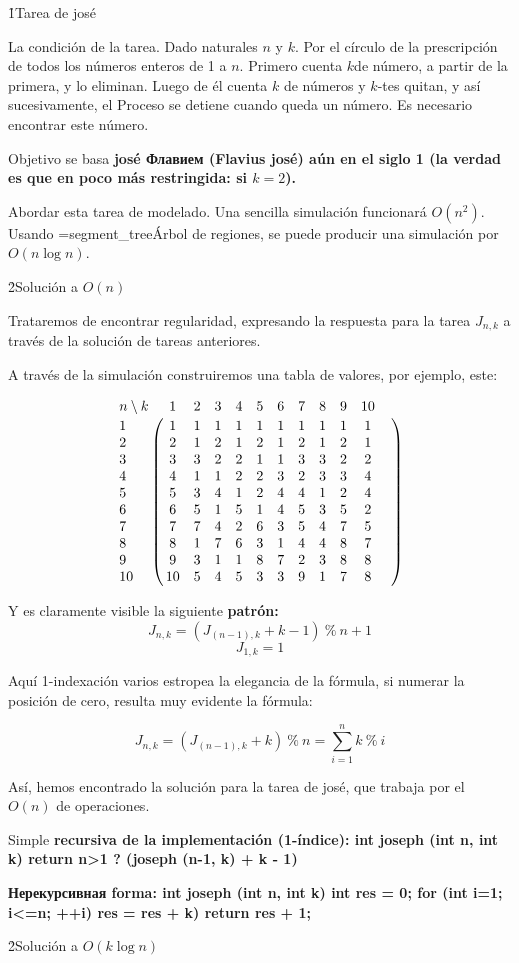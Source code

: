 \h1{Tarea de josé}

La condición de la tarea. Dado naturales $n$ y $k$. Por el círculo de la prescripción de todos los números enteros de 1 a $n$. Primero cuenta $k$de número, a partir de la primera, y lo eliminan. Luego de él cuenta $k$ de números y $k$-tes quitan, y así sucesivamente, el Proceso se detiene cuando queda un número. Es necesario encontrar este número.

Objetivo se basa \bf{josé Флавием} (Flavius josé) aún en el siglo 1 (la verdad es que en poco más restringida: si $k = 2$).

Abordar esta tarea de modelado. Una sencilla simulación funcionará $O (n^2)$. Usando \algohref=segment_tree{Árbol de regiones}, se puede producir una simulación por $O (n \log n)$.

\h2{Solución a $O(n)$}

Trataremos de encontrar regularidad, expresando la respuesta para la tarea $J_{n,k}$ a través de la solución de tareas anteriores.

A través de la simulación construiremos una tabla de valores, por ejemplo, este:

$$ \bordermatrix {
n \setminus k&1&2&3&4&5&6&7&8&9&10 \cr
1&1&1&1&1&1&1&1&1&1&1& \cr
2&2&1&2&1&2&1&2&1&2&1& \cr
3&3&3&2&2&1&1&3&3&2&2& \cr
4&4&1&1&2&2&3&2&3&3&4& \cr
5&5&3&4&1&2&4&4&1&2&4& \cr
6&6&5&1&5&1&4&5&3&5&2& \cr
7&7&7&4&2&6&3&5&4&7&5& \cr
8&8&1&7&6&3&1&4&4&8&7& \cr
9&9&3&1&1&8&7&2&3&8&8& \cr
10&10&5&4&5&3&3&9&1&7&8& \cr
} $$

Y es claramente visible la siguiente \bf{patrón}:
$$ J_{n,k} = \left( J_{(n-1),k} + k - 1 \right)\ \%\ n + 1 $$
$$ J_{1,k} = 1 $$

Aquí 1-indexación varios estropea la elegancia de la fórmula, si numerar la posición de cero, resulta muy evidente la fórmula:

$$ J_{n,k} = \left( J_{(n-1),k} + k \right)\ \%\ n = \sum_{i=1}^n k\ \%\ i $$

Así, hemos encontrado la solución para la tarea de josé, que trabaja por el $O (n)$ de operaciones.

Simple \bf{recursiva de la implementación} (1-índice):
\code
int joseph (int n, int k) {
return n>1 ? (joseph (n-1, k) + k - 1) %
}
\endcode

\bf{Нерекурсивная forma}:
\code
int joseph (int n, int k) {
int res = 0;
for (int i=1; i<=n; ++i)
res = res + k) %
return res + 1;
}
\endcode

\h2{Solución a $O(k \log n)$}

